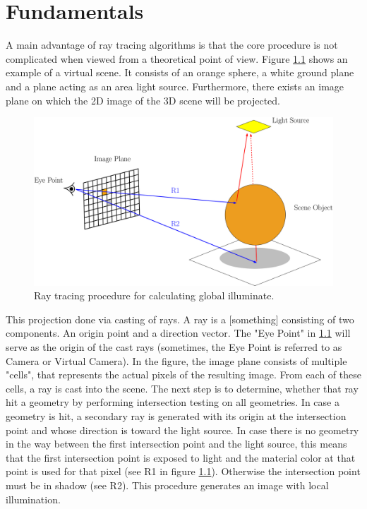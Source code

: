\chapter{Fundamentals}
\label{chap:refs}

A main advantage of ray tracing algorithms is that the core procedure is not complicated when viewed from a theoretical point of view. Figure \ref{fig:raytracer_general} shows an example of a virtual scene. It consists of an orange sphere, a white ground plane and a plane acting as an area light source. Furthermore, there exists an image plane on which the 2D image of the 3D scene will be projected. 

\begin{figure}[h]
	\centering
	\includegraphics[width=.9\linewidth]{img/1 fundamentals/ray_tracing.png}
	\caption{Ray tracing procedure for calculating global illuminate.}
	\label{fig:raytracer_general}
\end{figure}

This projection done via casting of rays. A ray is a [something] consisting of two components. An origin point and a direction vector. The "Eye Point" in \ref{fig:raytracer_general} will serve as the origin of the cast rays (sometimes, the Eye Point is referred to as Camera or Virtual Camera). In the figure, the image plane consists of multiple "cells", that represents the actual pixels of the resulting image. From each of these cells, a ray is cast into the scene. The next step is to determine, whether that ray hit a geometry by performing intersection testing on all geometries. In case a geometry is hit, a secondary ray is generated with its origin at the intersection point and whose direction is toward the light source. In case there is no geometry in the way between the first intersection point and the light source, this means that the first intersection point is exposed to light and the material color at that point is used for that pixel (see R1 in figure \ref{fig:raytracer_general}). Otherwise the intersection point must be in shadow (see R2). This procedure generates an image with local illumination.

